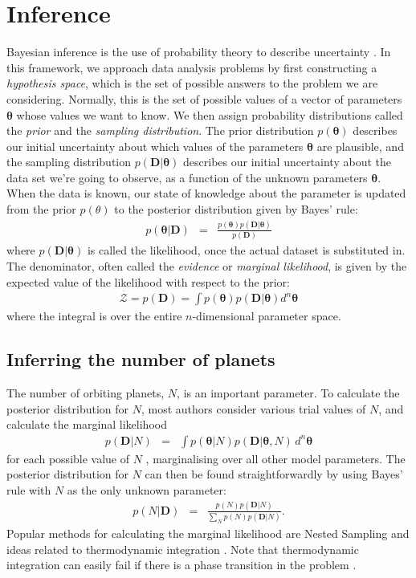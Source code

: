 \documentclass[useAMS,usenatbib]{mn2e}
\renewcommand{\btheta}{\boldsymbol{\theta}}
\newcommand{\bdata}{\boldsymbol{D}}
\begin{document}
\section{Inference}
Bayesian inference is the use of probability theory to describe uncertainty
\citep{sivia, ohagan}. In this framework, we approach data analysis problems by first
constructing a {\it hypothesis space}, which is the set of possible answers
to the problem we are considering. Normally, this is the set of possible
values of a vector of parameters $\btheta$ whose values we want
to know. We then assign probability distributions
called the {\it prior} and the {\it sampling distribution}. The prior
distribution $p(\btheta)$ describes
our initial uncertainty about which values of the parameters
$\btheta$ are plausible, and the
sampling distribution $p(\bdata | \btheta)$ describes
our initial uncertainty about the data set we're going to observe, as a
function of the unknown parameters $\btheta$.
When the data is known, our state of knowledge about the parameter is
updated from the prior $p(\theta)$ to the posterior distribution given by
Bayes' rule:
\begin{eqnarray}
p(\btheta | \bdata) &=&
\frac{p(\btheta)p(\bdata | \btheta)}
{p(\bdata)}
\end{eqnarray}
where $p(\bdata | \btheta)$ is called the likelihood, once the actual dataset
is substituted in.
The denominator, often called the {\it evidence} or
{\it marginal likelihood}, is given by the expected value of the likelihood
with respect to the prior:
\begin{eqnarray}
\mathcal{Z} = p(\bdata) = \int p(\btheta) p(\bdata | \btheta) d^n \btheta
\end{eqnarray}
where the integral is over the entire $n$-dimensional parameter space.

\subsection{Inferring the number of planets}
The number of orbiting planets, $N$, is an important parameter.
To calculate the posterior distribution for $N$, most authors
consider various trial values of $N$, and calculate the marginal likelihood
\begin{eqnarray}
p(\bdata | N) &=& \int p(\btheta | N) p(\bdata | \btheta, N) \, d^n \btheta
\end{eqnarray}
for each possible value of $N$
\citep[e.g.][]{2011MNRAS.415.2523G, 2011MNRAS.415.3462F, 2014MNRAS.437.3540F, fengji}, marginalising
over all other model parameters.
The posterior distribution for $N$ can then be found straightforwardly by
using Bayes' rule with $N$ as the only unknown parameter:
\begin{eqnarray}
p(N | \bdata) &=& \frac{p(N)p(\bdata | N)}{\sum_N p(N)p(\bdata | N)}.
\end{eqnarray}
Popular
methods for calculating the marginal likelihood are Nested Sampling
\citep{skilling} and ideas related to thermodynamic integration
\citep[e.g.][]{neal}. Note that thermodynamic integration can easily fail if
there is a phase transition in the problem \citep{skilling}.
\end{document}
